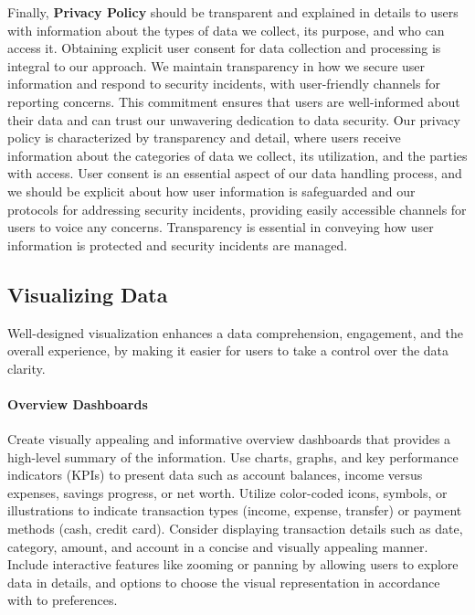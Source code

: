 Finally, \textbf{Privacy Policy} should be transparent and explained in details to users with information about the 
types of data we collect, its purpose, and who can access it. Obtaining explicit user consent for data collection and 
processing is integral to our approach. We maintain transparency in how we secure user information and respond to 
security incidents, with user-friendly channels for reporting concerns. This commitment ensures that users are 
well-informed about their data and can trust our unwavering dedication to data security. Our privacy policy is 
characterized by transparency and detail, where users receive information about the categories of data we collect, 
its utilization, and the parties with access. User consent is an essential aspect of our data handling process, and 
we should be explicit about how user information is safeguarded and our protocols for addressing security incidents, 
providing easily accessible channels for users to voice any concerns. Transparency is essential in conveying how user 
information is protected and security incidents are managed.



\subsection{Visualizing Data}

Well-designed visualization enhances a data comprehension, engagement, and the overall experience, by making it easier 
for users to take a control over the data clarity.

\paragraph{Overview Dashboards}
Create visually appealing and informative overview dashboards that provides a high-level summary of the information. 
Use charts, graphs, and key performance indicators (KPIs) to present data such as account balances, income versus 
expenses, savings progress, or net worth. Utilize color-coded icons, symbols, or illustrations to indicate transaction 
types (income, expense, transfer) or payment methods (cash, credit card). Consider displaying transaction details such 
as date, category, amount, and account in a concise and visually appealing manner. Include interactive features like 
zooming or panning by allowing users to explore data in details, and options to choose the visual representation in
accordance with to preferences.

